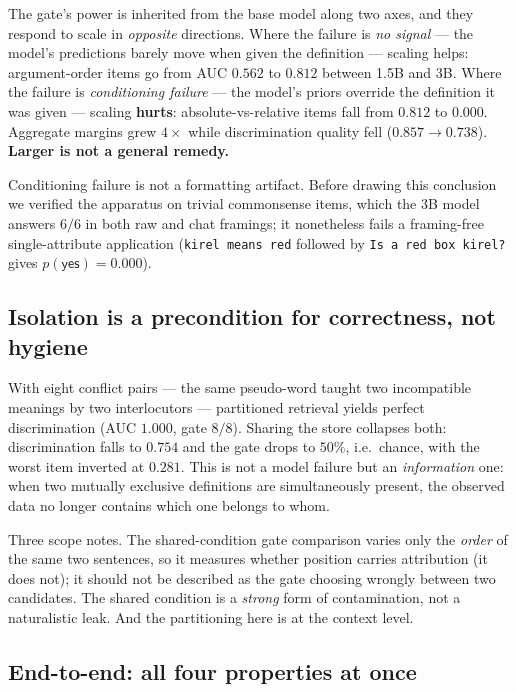 \documentclass[11pt]{article}
\begin{document}
The gate's power is inherited from the base model along two axes, and they respond to scale
in \emph{opposite} directions. Where the failure is \emph{no signal} --- the model's
predictions barely move when given the definition --- scaling helps: argument-order items
go from AUC $0.562$ to $0.812$ between 1.5B and 3B. Where the failure is
\emph{conditioning failure} --- the model's priors override the definition it was given ---
scaling \textbf{hurts}: absolute-vs-relative items fall from $0.812$ to $\mathbf{0.000}$.
Aggregate margins grew $4\times$ while discrimination quality fell ($0.857 \to 0.738$).
\textbf{Larger is not a general remedy.}

Conditioning failure is not a formatting artifact. Before drawing this conclusion we
verified the apparatus on trivial commonsense items, which the 3B model answers $6/6$ in
both raw and chat framings; it nonetheless fails a framing-free single-attribute
application (\texttt{kirel means red} followed by \texttt{Is a red box kirel?} gives
$p(\textsf{yes}) = 0.000$).

\subsection{Isolation is a precondition for correctness, not hygiene}

With eight conflict pairs --- the same pseudo-word taught two incompatible meanings by two
interlocutors --- partitioned retrieval yields perfect discrimination (AUC $1.000$, gate
$8/8$). Sharing the store collapses both: discrimination falls to $0.754$ and the gate
drops to $50\%$, i.e.\ chance, with the worst item inverted at $0.281$. This is not a model
failure but an \emph{information} one: when two mutually exclusive definitions are
simultaneously present, the observed data no longer contains which one belongs to whom.

Three scope notes. The shared-condition gate comparison varies only the \emph{order} of the
same two sentences, so it measures whether position carries attribution (it does not); it
should not be described as the gate choosing wrongly between two candidates. The shared
condition is a \emph{strong} form of contamination, not a naturalistic leak. And the
partitioning here is at the context level.

\subsection{End-to-end: all four properties at once}
\label{sec:endtoend}
\end{document}

